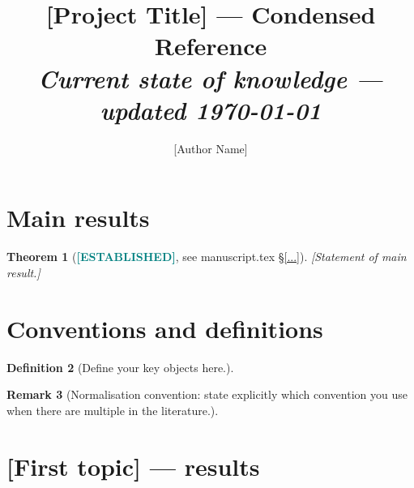 \documentclass[11pt, a4paper]{article}
\title{[Project Title] — Condensed Reference\\
{\normalsize\textit{Current state of knowledge — updated \today}}}
\author{[Author Name]}
\date{}
\newcommand{\established}{\textcolor{teal}{\textbf{[ESTABLISHED]}}}
\theoremstyle{plain}
\newtheorem{theorem}{Theorem}[section]
\theoremstyle{definition}
\newtheorem{definition}[theorem]{Definition}
\newtheorem{remark}[theorem]{Remark}
\begin{document}
\maketitle

\tableofcontents
\newpage

\section{Main results}
\label{sec:mainresults}


\begin{theorem}[\established, see manuscript.tex \S\ref{...}]
[Statement of main result.]
\end{theorem}

\section{Conventions and definitions}
\label{sec:conventions}


\begin{definition}
[Define your key objects here.]
\end{definition}

\begin{remark}
[Normalisation convention: state explicitly which convention you use when
there are multiple in the literature.]
\end{remark}

\section{[First topic] — results}
\label{sec:topic1results}

\end{document}
